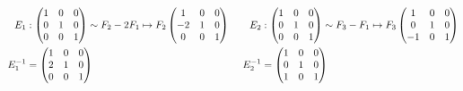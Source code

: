     \[
        \begin{aligned}
            E_1 &:
            \begin{pmatrix}
                1 & 0 & 0 \\
                0 & 1 & 0 \\
                0 & 0 & 1
            \end{pmatrix}
            \sim
            \begin{aligned}
                F_2 - 2F_1 &\mapsto F_2 \\
            \end{aligned}
            \begin{pmatrix}
                1 & 0 & 0 \\
                -2 & 1 & 0 \\
                0 & 0 & 1
            \end{pmatrix} \\
            E_1^{-1} &= 
            \begin{pmatrix}
                1 & 0 & 0 \\
                2 & 1 & 0 \\
                0 & 0 & 1
            \end{pmatrix}
        \end{aligned}
        \hspace{0.5cm}
        \begin{aligned}
            E_2 &: 
            \begin{pmatrix}
                1 & 0 & 0 \\
                0 & 1 & 0 \\
                0 & 0 & 1
            \end{pmatrix}
            \sim
            \begin{aligned}
                F_3 - F_1 &\mapsto F_3 \\
            \end{aligned}
            \begin{pmatrix}
                1 & 0 & 0 \\
                0 & 1 & 0 \\
                -1 & 0 & 1
            \end{pmatrix} \\
            E_2^{-1} &=
            \begin{pmatrix}
                1 & 0 & 0 \\
                0 & 1 & 0 \\
                1 & 0 & 1
            \end{pmatrix}
        \end{aligned}
    \]
